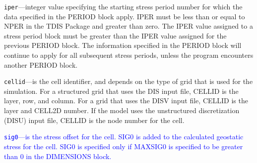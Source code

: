 \begin{description}
\item \texttt{iper}---integer value specifying the starting stress period number for which the data specified in the PERIOD block apply.  IPER must be less than or equal to NPER in the TDIS Package and greater than zero.  The IPER value assigned to a stress period block must be greater than the IPER value assigned for the previous PERIOD block.  The information specified in the PERIOD block will continue to apply for all subsequent stress periods, unless the program encounters another PERIOD block.

\item \texttt{cellid}---is the cell identifier, and depends on the type of grid that is used for the simulation.  For a structured grid that uses the DIS input file, CELLID is the layer, row, and column.   For a grid that uses the DISV input file, CELLID is the layer and CELL2D number.  If the model uses the unstructured discretization (DISU) input file, CELLID is the node number for the cell.

\item \textcolor{blue}{\texttt{sig0}---is the stress offset for the cell. SIG0 is added to the calculated geostatic stress for the cell. SIG0 is specified only if MAXSIG0 is specified to be greater than 0 in the DIMENSIONS block.}

\end{description}

